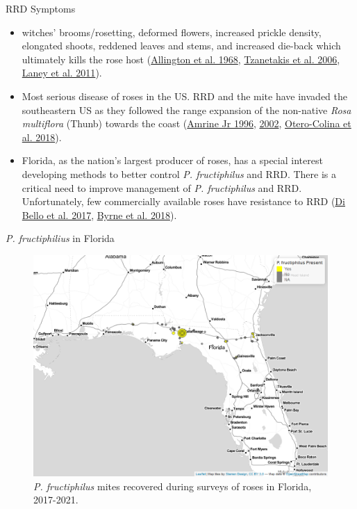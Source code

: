 \documentclass[
  ignorenonframetext,
]{beamer}
\providecommand{\tightlist}{%
  \setlength{\itemsep}{0pt}\setlength{\parskip}{0pt}}
\begin{document}
\begin{frame}
\begin{block}{RRD Symptoms}
\begin{itemize}
\tightlist
\item
  witches' brooms/rosetting, deformed flowers, increased prickle
  density, elongated shoots, reddened leaves and stems, and increased
  die-back which ultimately kills the rose host
  (\protect\hyperlink{ref-Allington1968}{Allington et al. 1968},
  \protect\hyperlink{ref-Tzanetakis2006}{Tzanetakis et al. 2006},
  \protect\hyperlink{ref-Laney2011}{Laney et al. 2011}).
\item
  Most serious disease of roses in the US. RRD and the mite have invaded
  the southeastern US as they followed the range expansion of the
  non-native \emph{Rosa multiflora} (Thunb) towards the coast
  (\protect\hyperlink{ref-Amrine1996}{Amrine Jr 1996},
  \protect\hyperlink{ref-Amrine2002}{2002},
  \protect\hyperlink{ref-Otero-Colina2018}{Otero-Colina et al. 2018}).
\item
  Florida, as the nation's largest producer of roses, has a special
  interest developing methods to better control \emph{P. fructiphilus}
  and RRD. There is a critical need to improve management of \emph{P.
  fructiphilus} and RRD. Unfortunately, few commercially available roses
  have resistance to RRD (\protect\hyperlink{ref-Bello2017}{Di Bello et
  al. 2017}, \protect\hyperlink{ref-Byrne2018}{Byrne et al. 2018}).
\end{itemize}
\end{block}

\begin{block}{\emph{P. fructiphilius} in Florida}
\protect\hypertarget{p.-fructiphilius-in-florida}{}
\begin{figure}[p]
\includegraphics[width=1\linewidth]{figure/rrv_survey_map_fl_pf} \caption{\textit{P. fructiphilus} mites recovered during surveys of roses in Florida, 2017-2021.}\label{fig:survey-map-1}
\end{figure}


\end{block}
\end{frame}
\end{document}
